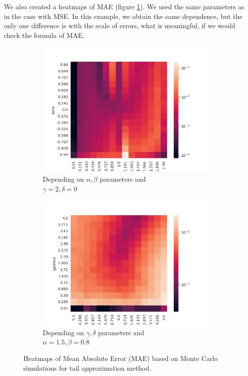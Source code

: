 \documentclass{article}
\begin{document}
        We also created a heatmaps of MAE (figure \ref{heat2}). We used the same parameters as in the case with MSE. In this example, we obtain the same dependence, but the only one difference is with the scale of errors, what is meaningful, if we would check the formula of MAE.		
		
		\begin{figure}[H]
			\begin{subfigure}{.5\textwidth}
				\centering
				\includegraphics[width=1\linewidth]{images/heatmap_cdf_MAE_alpha_beta.png}
				\caption{Depending on $\alpha, \beta$ parameters and \\$\gamma = 2, \delta = 0$}
			\end{subfigure}
			\begin{subfigure}[r]{.5\textwidth}
				\centering
				\includegraphics[width=1\linewidth]{images/heatmap_cdf_MAE_gamma_delta.png}
				\caption{Depending on $\gamma, \delta$ parameters and \\$\alpha = 1.5, \beta = 0.8$}
			\end{subfigure}
			\caption{Heatmaps of Mean Absolute Error (MAE) based on Monte Carlo simulations for tail approximation method.}\label{heat2}
		\end{figure}
\end{document}
